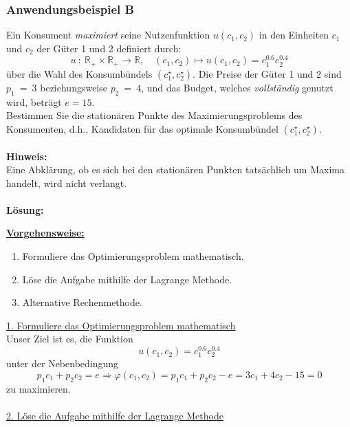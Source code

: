 \subsubsection*{Anwendungsbeispiel B}
Ein Konsument \textit{maximiert} seine Nutzenfunktion $u(c_1,c_2)$ in den Einheiten $c_1$ und $c_2$
der Güter 1 und 2 definiert durch:
\begin{equation*}
u \ : \ \mathbb{R}_+ \times \mathbb{R}_+ \to \mathbb{R},
\quad (c_1,c_2) \mapsto u(c_1,c_2) = c_1^{0.6} c_2^{0.4}
\end{equation*}
über die Wahl des Konsumbündels $(c_1^\star,c_2^\star)$.
Die Preise der Güter 1 und 2 sind $p_1 \ = \ 3$ beziehungsweise $p_2 \ = \ 4$,
und das Budget, welches \textit{vollständig} genutzt wird, beträgt $e = 15$.
\\
Bestimmen Sie die stationären Punkte des Maximierungsproblems des Konsumenten, 
d.h., Kandidaten für das optimale Konsumbündel $(c_1^\star,c_2^\star)$.
\\
\\
\textbf{Hinweis:}\\ 
Eine Abklärung, ob es sich bei den stationären Punkten tatsächlich um Maxima handelt, wird nicht verlangt.
\\
\\
\textbf{Lösung:}
\begin{mdframed}
\underline{\textbf{Vorgehensweise:}}
\renewcommand{\labelenumi}{\theenumi.}
\begin{enumerate}
\item Formuliere das Optimierungsproblem mathematisch.
\item Löse die Aufgabe mithilfe der Lagrange Methode.
\item Alternative Rechenmethode.
\end{enumerate}
\end{mdframed}
\underline{1. Formuliere das Optimierungsproblem mathematisch}\\
Unser Ziel ist es, die Funktion
\begin{equation*}
u(c_1,c_2) = c_1^{0.6}c_2^{0.4}
\end{equation*}
unter der Nebenbedingung
\begin{equation*}
p_1 c_1 + p_2 c_2 = e \Rightarrow
\varphi(c_1,c_2) = p_1 c_1 + p_2 c_2 - e = 3 c_1 + 4 c_2 - 15 = 0
\end{equation*}
zu maximieren.
\\
\\
\underline{2. Löse die Aufgabe mithilfe der Lagrange Methode}\\
